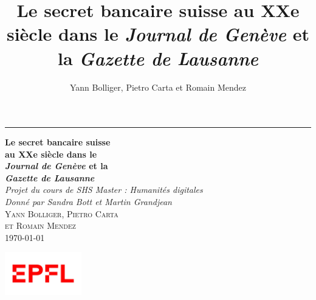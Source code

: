 \documentclass[a4paper, 11pt]{article}
\title{
   Le secret bancaire suisse au XXe siècle dans le
  \textit{Journal de Genève} et la \textit{Gazette de Lausanne}
}
\author{Yann Bolliger, Pietro Carta et Romain Mendez}
\begin{document}
  

\begin{titlepage} 
	\raggedleft %
	
	\rule{1pt}{\textheight} %
	\hspace{0.05\textwidth} %
	\parbox[b]{0.75\textwidth}{ %
		
		{\Huge\bfseries 
		  Le secret bancaire suisse \\[0.4\baselineskip]
		   au XXe siècle dans le \\[0.4\baselineskip]
          \textit{Journal de Genève} et la \\[0.4\baselineskip]
          \textit{Gazette de Lausanne}
		}\\[2\baselineskip] 
		
		\textit{\large
		  Projet du cours de SHS Master : Humanités digitales \\
		  Donné par Sandra Bott et Martin Grandjean
		}\\[4\baselineskip] 
		
		\textsc{\Large
		    Yann Bolliger, Pietro Carta \\ et Romain Mendez
		}\\[2\baselineskip] 
		
		{\today }
		
		\vspace{0.35\textheight} %
		
		{\noindent 
		  \includegraphics[width=0.25\textwidth]{logo.png}
		}
	}

\end{titlepage}
  

%
%
%
%
%
%
%
\end{document}
